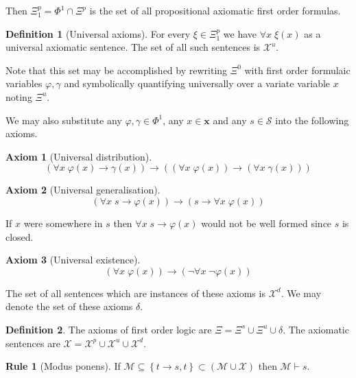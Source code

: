 \documentclass{amsbook}
\newcommand{\setsm}[1]{\left\{#1\right\}}
\newcommand{\infers}{\mathrel\vdash}
\newcommand{\univ}[1]{\mathord\forall#1\;}
\newcommand{\then}{\mathrel\rightarrow}
\theoremstyle{definition}
\newtheorem{axm}{Axiom}[chapter]
\newtheorem{frule}{Rule}[chapter]
\newtheorem{dfn}{Definition}[section]
\begin{document}
Then $\Xi^p_1 = \Phi^1 \cap \Xi^p$ is the set of all propositional axiomatic first order formulas.

\begin{dfn}[Universal axioms]
    For every $\xi \in \Xi^p_1$ we have $\univ x \xi(x)$ as a universal axiomatic sentence. The set of all such sentences is $\mathcal X^u$.

    Note that this set may be accomplished by rewriting $\Xi^0$ with first order formulaic variables $\varphi, \gamma$ and symbolically quantifying universally over a variate variable $x$ noting $\Xi^u$.
\end{dfn}

We may also substitute any $\varphi, \gamma \in \Phi^1$, any $x \in \mathbf x$ and any $s \in \mathcal S$ into the following axioms.

\begin{axm}[Universal distribution]
    $$\left( \univ x \varphi(x) \then \gamma(x) \right) \then \left(\left( \univ x \varphi(x) \right)  \then \left( \univ x \gamma(x) \right) \right)$$
\end{axm}

\begin{axm}[Universal generalisation]
    $$\left( \univ x s \then \varphi(x) \right) \then \left( s \then \univ x \varphi(x) \right)$$
\end{axm}

If $x$ were somewhere in $s$ then $\univ x s \then \varphi(x)$ would not be well formed since $s$ is closed.

\begin{axm}[Universal existence]
    $$\left( \univ x \varphi(x) \right) \then \left( \neg \univ x \neg\varphi(x) \right)$$
\end{axm}

The set of all sentences which are instances of these axioms is $\mathcal X^d$. We may denote the set of these axioms $\delta$.

\begin{dfn}
    The axioms of first order logic are $\Xi = \Xi^s \cup \Xi^u \cup \delta$. The axiomatic sentences are $\mathcal X = \mathcal X^p \cup \mathcal X^u \cup \mathcal X^d$.
\end{dfn}

\begin{frule}[Modus ponens]
    If $\mathcal M \subseteq \setsm {t \then s, t} \subset (\mathcal M \cup \mathcal X)$ then $\mathcal M \infers s$.
\end{frule}
\end{document}
